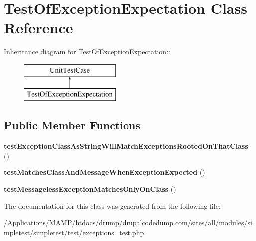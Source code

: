 \hypertarget{class_test_of_exception_expectation}{
\section{TestOfExceptionExpectation Class Reference}
\label{class_test_of_exception_expectation}
}
Inheritance diagram for TestOfExceptionExpectation::\begin{figure}[H]
\begin{center}
\leavevmode
\includegraphics[height=2cm]{class_test_of_exception_expectation}
\end{center}
\end{figure}
\subsection*{Public Member Functions}
\begin{DoxyCompactItemize}
\item 
\hypertarget{class_test_of_exception_expectation_afafcc0ecf234a127e9e51dd3fe8fba7c}{
{\bfseries testExceptionClassAsStringWillMatchExceptionsRootedOnThatClass} ()}
\label{class_test_of_exception_expectation_afafcc0ecf234a127e9e51dd3fe8fba7c}

\item 
\hypertarget{class_test_of_exception_expectation_a63adb2272aa272316335ae0f5c6c0f2f}{
{\bfseries testMatchesClassAndMessageWhenExceptionExpected} ()}
\label{class_test_of_exception_expectation_a63adb2272aa272316335ae0f5c6c0f2f}

\item 
\hypertarget{class_test_of_exception_expectation_a166caaa1221207ead9cf987e8cbb23d4}{
{\bfseries testMessagelessExceptionMatchesOnlyOnClass} ()}
\label{class_test_of_exception_expectation_a166caaa1221207ead9cf987e8cbb23d4}

\end{DoxyCompactItemize}


The documentation for this class was generated from the following file:\begin{DoxyCompactItemize}
\item 
/Applications/MAMP/htdocs/drump/drupalcodedump.com/sites/all/modules/simpletest/simpletest/test/exceptions\_\-test.php\end{DoxyCompactItemize}
